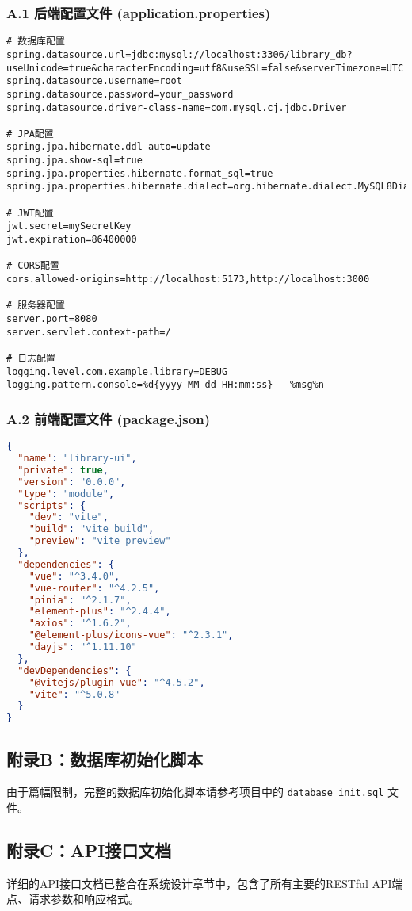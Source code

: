 \documentclass[12pt,a4paper]{article}
\begin{document}
\subsubsection*{A.1 后端配置文件 (application.properties)}
\begin{lstlisting}[language=properties]
# 数据库配置
spring.datasource.url=jdbc:mysql://localhost:3306/library_db?useUnicode=true&characterEncoding=utf8&useSSL=false&serverTimezone=UTC
spring.datasource.username=root
spring.datasource.password=your_password
spring.datasource.driver-class-name=com.mysql.cj.jdbc.Driver

# JPA配置
spring.jpa.hibernate.ddl-auto=update
spring.jpa.show-sql=true
spring.jpa.properties.hibernate.format_sql=true
spring.jpa.properties.hibernate.dialect=org.hibernate.dialect.MySQL8Dialect

# JWT配置
jwt.secret=mySecretKey
jwt.expiration=86400000

# CORS配置
cors.allowed-origins=http://localhost:5173,http://localhost:3000

# 服务器配置
server.port=8080
server.servlet.context-path=/

# 日志配置
logging.level.com.example.library=DEBUG
logging.pattern.console=%d{yyyy-MM-dd HH:mm:ss} - %msg%n
\end{lstlisting}

\subsubsection*{A.2 前端配置文件 (package.json)}
\begin{lstlisting}[language=json]
{
  "name": "library-ui",
  "private": true,
  "version": "0.0.0",
  "type": "module",
  "scripts": {
    "dev": "vite",
    "build": "vite build",
    "preview": "vite preview"
  },
  "dependencies": {
    "vue": "^3.4.0",
    "vue-router": "^4.2.5",
    "pinia": "^2.1.7",
    "element-plus": "^2.4.4",
    "axios": "^1.6.2",
    "@element-plus/icons-vue": "^2.3.1",
    "dayjs": "^1.11.10"
  },
  "devDependencies": {
    "@vitejs/plugin-vue": "^4.5.2",
    "vite": "^5.0.8"
  }
}
\end{lstlisting}

\subsection*{附录B：数据库初始化脚本}

由于篇幅限制，完整的数据库初始化脚本请参考项目中的 \texttt{database\_init.sql} 文件。

\subsection*{附录C：API接口文档}

详细的API接口文档已整合在系统设计章节中，包含了所有主要的RESTful API端点、请求参数和响应格式。
\end{document}
